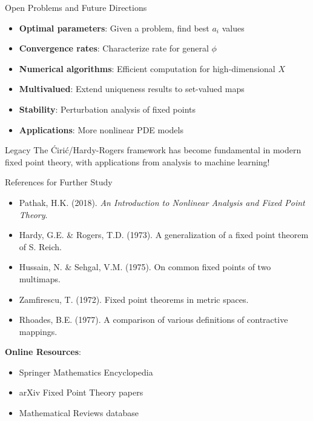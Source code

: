 \documentclass[aspectratio=169,10pt]{beamer}
\begin{document}
\begin{frame}{Open Problems and Future Directions}
    \begin{itemize}
        \setlength\itemsep{0.3cm}
        \item \textbf{Optimal parameters}: Given a problem, find best $a_i$ values
        \item \textbf{Convergence rates}: Characterize rate for general $\phi$
        \item \textbf{Numerical algorithms}: Efficient computation for high-dimensional $X$
        \item \textbf{Multivalued}: Extend uniqueness results to set-valued maps
        \item \textbf{Stability}: Perturbation analysis of fixed points
        \item \textbf{Applications}: More nonlinear PDE models
    \end{itemize}

    \vspace{0.4cm}
    \begin{block}{Legacy}
        The Ćirić/Hardy-Rogers framework has become fundamental in modern
        fixed point theory, with applications from analysis to machine learning!
    \end{block}
\end{frame}

\begin{frame}{References for Further Study}
    \begin{itemize}
        \item Pathak, H.K. (2018). \textit{An Introduction to Nonlinear Analysis and Fixed Point Theory}.
        \item Hardy, G.E. \& Rogers, T.D. (1973). A generalization of a fixed point theorem of S. Reich.
        \item Hussain, N. \& Sehgal, V.M. (1975). On common fixed points of two multimaps.
        \item Zamfirescu, T. (1972). Fixed point theorems in metric spaces.
        \item Rhoades, B.E. (1977). A comparison of various definitions of contractive mappings.
    \end{itemize}

    \vspace{0.5cm}
    \textbf{Online Resources}:
    \begin{itemize}
        \item Springer Mathematics Encyclopedia
        \item arXiv Fixed Point Theory papers
        \item Mathematical Reviews database
    \end{itemize}
\end{frame}
\end{document}
